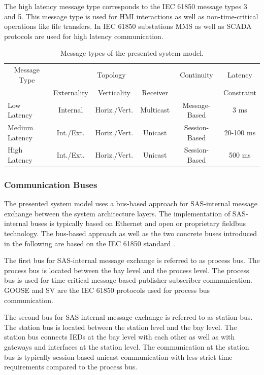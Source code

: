 The high latency message type corresponds to the IEC 61850 message types 3 and 5.
This message type is used for HMI interactions as well as non-time-critical operations like file transfers.
In IEC 61850 substations MMS as well as SCADA protocols are used for high latency communication.
\begin{table}
    \centering
    \small
    \caption{Message types of the presented system model.}
    \label{tab:message_types}
    \begin{tabular}{l c c c c c}
    \toprule
    \multicolumn{1}{c}{Message Type} & \multicolumn{3}{c}{Topology} & Continuity & Latency\\
    & Externality & Verticality & Receiver & & Constraint\\
    \midrule
    Low Latency & Internal & Horiz./Vert. & Multicast & Message-Based & 3 ms\\
    Medium Latency & Int./Ext. & Horiz./Vert. & Unicast & Session-Based & 20-100 ms\\
    High Latency & Int./Ext. & Horiz./Vert. & Unicast & Session-Based & 500 ms\\
    \bottomrule
    \end{tabular}
\end{table}

\subsubsection{Communication Buses}
The presented system model uses a bus-based approach for SAS-internal message exchange between the system architecture layers.
The implementation of SAS-internal buses is typically based on Ethernet and open or proprietary fieldbus technology.
The bus-based approach as well as the two concrete buses introduced in the following are based on the IEC 61850 standard \cite{IEC61850P5}.

The first bus for SAS-internal message exchange is referred to as process bus.
The process bus is located between the bay level and the process level.
The process bus is used for time-critical message-based publisher-subscriber communication.
GOOSE and SV are the IEC 61850 protocols used for process bus communication.

The second bus for SAS-internal message exchange is referred to as station bus.
The station bus is located between the station level and the bay level.
The station bus connects IEDs at the bay level with each other as well as with gateways and interfaces at the station level.
The communication at the station bus is typically session-based unicast communication with less strict time requirements compared to the process bus.

